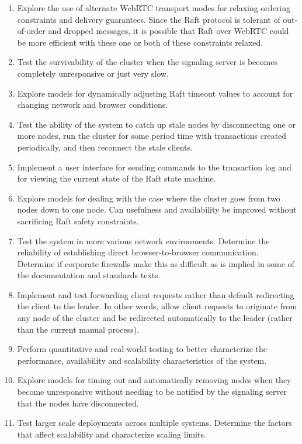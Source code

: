 \documentclass{acmtog} %
\begin{document}
\begin{enumerate}
\item Explore the use of alternate WebRTC transport modes for relaxing
  ordering constraints and delivery guarantees. Since the Raft
  protocol is tolerant of out-of-order and dropped messages, it is
  possible that Raft over WebRTC could be more efficient with these
  one or both of these constraints relaxed.
\item Test the survivability of the cluster when the signaling server is
  becomes completely unresponsive or just very slow.
\item Explore models for dynamically adjusting Raft timeout values to
  account for changing network and browser conditions.
\item Test the ability of the system to catch up stale nodes by
  disconnecting one or more nodes, run the cluster for some period
  time with transactions created periodically, and then reconnect the stale
  clients.
\item Implement a user interface for sending commands to the transaction
  log and for viewing the current state of the Raft state machine.
\item Explore models for dealing with the case where the cluster goes from
  two nodes down to one node. Can usefulness and availability be
  improved without sacrificing Raft safety constraints.
\item Test the system in more various network environments. Determine the
  reliability of establishing direct browser-to-browser communication.
  Determine if corporate firewalls make this as difficult as is
  implied in some of the documentation and standards texts.
\item Implement and test forwarding client requests rather than default
  redirecting the client to the leader. In other words, allow client
  requests to originate from any node of the cluster and be redirected
  automatically to the leader (rather than the current manual
  process).
\item Perform quantitative and real-world testing to better characterize
  the performance, availability and scalability characteristics of the
  system.
\item Explore models for timing out and automatically removing nodes
  when they become unresponsive without needing to be notified by the
  signaling server that the nodes have disconnected.
\item Test larger scale deployments across multiple systems. Determine the
  factors that affect scalability and characterize scaling limits.

\end{enumerate}
\end{document}
